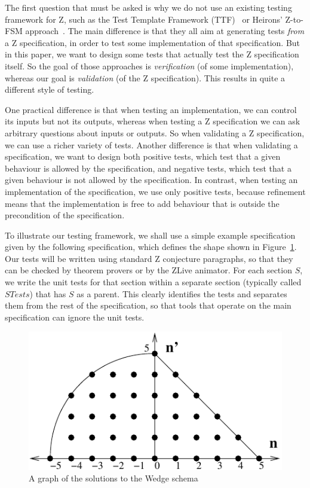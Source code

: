 \documentclass{llncs}
\begin{document}
The first question that must be asked is why we do not use an existing
testing framework for Z, such as the Test Template Framework
(TTF)~\cite{Stocks93,carrington94} or Heirons' Z-to-FSM
approach~\cite{hierons97}.  The main difference is that they all aim at
generating tests \emph{from} a Z specification, in order to test some
implementation of that specification.  But in this paper, we want to design
some tests that actually test the Z specification itself.  So the goal of
those approaches is \emph{verification} (of some implementation), whereas
our goal is \emph{validation} (of the Z specification).  This results in
quite a different style of testing.  

One practical difference is that when testing an implementation, we can
control its 
inputs but not its outputs, whereas when testing a Z specification we can
ask arbitrary questions about inputs or outputs.  So when validating a Z
specification, we can use a richer variety of tests.  Another difference is
that when validating a specification, we want to design both positive
tests, which test that a given behaviour is allowed by the specification,
and negative tests, which test that a given behaviour is not allowed by the
specification.  In contrast, when testing an implementation of the
specification, we use only positive tests, because refinement means that
the implementation is free to add behaviour that is outside the
precondition of the specification.

To illustrate our testing framework, we shall use a simple example
specification given by the following specification, which defines the
shape shown in Figure~\ref{fig:wedge}.  Our tests will be written
using standard Z conjecture paragraphs, so that they can be checked by
theorem provers or by the ZLive animator.  For each section $S$, we
write the unit tests for that section within a separate section
(typically called $STests$) that has $S$ as a parent.  This clearly
identifies the tests and separates them from the rest of the
specification, so that tools that operate on the main specification
can ignore the unit tests.

\begin{figure}[htbp]
  \centering
  \includegraphics{wedge}
  \caption{A graph of the solutions to the Wedge schema}
  \label{fig:wedge}
\end{figure}
\end{document}
